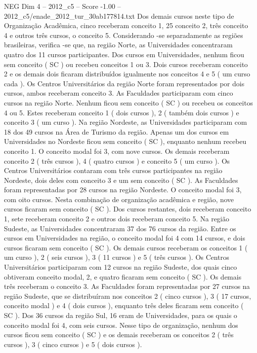 \begin{textsample}{NEG Dim 4 – 2012\_c5 – Score -1.00 – 2012\_c5/enade\_2012\_tur\_30ab177814.txt}
Dos demais cursos neste tipo de Organização Acadêmica, cinco receberam conceito 1, 25 conceito 2, três conceito 4 e outros três cursos, o conceito 5.
Considerando -se separadamente as regiões brasileiras, verifica -se que, na região Norte, as Universidades concentraram quatro dos 11 cursos participantes.
Dos cursos em Universidades, nenhum ficou sem conceito ( SC ) ou recebeu conceitos 1 ou 3.
Dois cursos receberam conceito 2 e os demais dois ficaram distribuídos igualmente nos conceitos 4 e 5 ( um curso cada ).
Os Centros Universitários da região Norte foram representados por dois cursos, ambos receberam conceito 3.
As Faculdades participaram com cinco cursos na região Norte.
Nenhum ficou sem conceito ( SC ) ou recebeu os conceitos 4 ou 5.
Estes receberam conceito 1 ( dois cursos ), 2 ( também dois cursos ) e conceito 3 ( um curso ).
Na região Nordeste, as Universidades participaram com 18 dos 49 cursos na Área de Turismo da região.
Apenas um dos cursos em Universidades no Nordeste ficou sem conceito ( SC ), enquanto nenhum recebeu conceito 1.
O conceito modal foi 3, com nove cursos.
Os demais receberam conceito 2 ( três cursos ), 4 ( quatro cursos ) e conceito 5 ( um curso ).
Os Centros Universitários contaram com três cursos participantes na região Nordeste, dois deles com conceito 3 e um sem conceito ( SC ).
As Faculdades foram representadas por 28 cursos na região Nordeste.
O conceito modal foi 3, com oito cursos.
Nesta combinação de organização acadêmica e região, nove cursos ficaram sem conceito ( SC ).
Dos cursos restantes, dois receberam conceito 1, sete receberam conceito 2 e outros dois receberam conceito 5.
Na região Sudeste, as Universidades concentraram 37 dos 76 cursos da região.
Entre os cursos em Universidades na região, o conceito modal foi 4 com 14 cursos, e dois cursos ficaram sem conceito ( SC ).
Os demais cursos receberam os conceitos 1 ( um curso ), 2 ( seis cursos ), 3 ( 11 cursos ) e 5 ( três cursos ).
Os Centros Universitários participaram com 12 cursos na região Sudeste, dos quais cinco obtiveram conceito modal, 2, e quatro ficaram sem conceito ( SC ).
Os demais três receberam o conceito 3.
As Faculdades foram representadas por 27 cursos na região Sudeste, que se distribuíram nos conceitos 2 ( cinco cursos ), 3 ( 17 cursos, conceito modal ) e 4 ( dois cursos ), enquanto três deles ficaram sem conceito ( SC ).
Dos 36 cursos da região Sul, 16 eram de Universidades, para os quais o conceito modal foi 4, com seis cursos.
Nesse tipo de organização, nenhum dos cursos ficou sem conceito ( SC ) e os demais receberam os conceitos 2 ( três cursos ), 3 ( cinco cursos ) e 5 ( dois cursos ).

\end{textsample}
